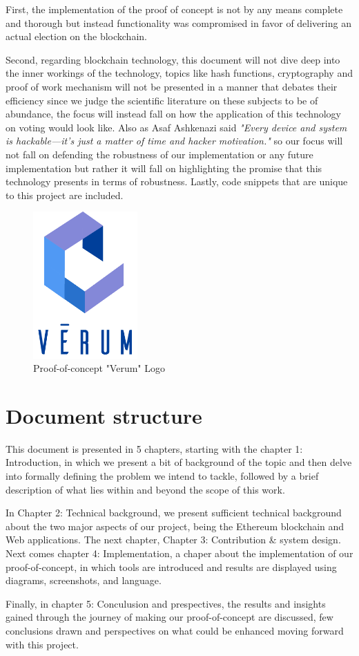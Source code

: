 First, the implementation of the proof of concept is not by any means complete and thorough but instead functionality was compromised in favor of delivering an actual election on the blockchain.

Second, regarding blockchain technology, this document will not dive deep into the inner workings of the technology, topics like hash functions, cryptography and proof of work mechanism will not be presented in a manner that debates their efficiency since we judge the scientific literature on these subjects to be of abundance, the focus will instead fall on how the application of this technology on voting would look like. Also as Asaf Ashkenazi said \textit{"Every device and system is hackable—it’s just a matter of time and hacker motivation."}\cite{leonhermonHowHackedLight2019} so our focus will not fall on defending the robustness of our implementation or any future implementation but rather it will fall on highlighting the promise that this technology presents in terms of robustness.
Lastly, code snippets that are unique to this project are included.

\begin{figure}[h]
	\centering
		\includegraphics[width=4cm]{images/chapter1/verum.png}
		\caption{{\footnotesize Proof-of-concept "Verum" Logo}}
\end{figure}

\section{Document structure}
This document is presented in 5 chapters, starting with the chapter 1: Introduction, in which we present a bit of background of the topic and then delve into formally defining the problem we intend to tackle, followed by a brief description of what lies within and beyond the scope of this work.

In Chapter 2: Technical background, we present sufficient technical background about the two major aspects of our project, being the Ethereum blockchain and Web applications. The next chapter, Chapter 3: Contribution \& system design. Next comes chapter 4: Implementation, a chaper about the implementation of our proof-of-concept, in which tools are introduced and results are displayed using diagrams, screenshots, and language.

Finally, in chapter 5: Conculusion and prespectives, the results and insights gained through the journey of making our proof-of-concept are discussed, few conclusions drawn and perspectives on what could be enhanced moving forward with this project.